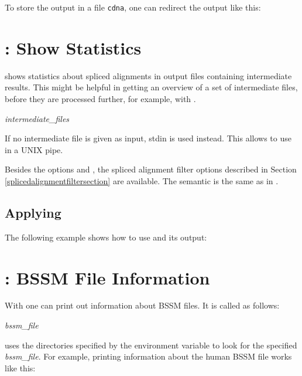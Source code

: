 \documentclass[11pt,a4paper,titlepage]{article}
\begin{document}

To store the output in a file \texttt{cdna}, one can redirect the output like this:


\section{\Callgthfilestat: Show Statistics}
\label{gthfilestatsection}
\Callgthfilestat shows statistics about spliced alignments in \Gth output files containing intermediate results.
This might be helpful in getting an overview of a set of intermediate files, before they are processed further, for example, with \Callgthsplit.

\medskip
{} \textit{intermediate\_files}
\medskip

If no intermediate file is given as input, stdin is used instead. This allows
to use \Callgthfilestat in a UNIX pipe.

Besides the options  and , the spliced alignment filter options described in Section \ref{splicedalignmentfiltersection}
are available. The semantic is the same as in \Callgth.

\subsection{Applying \Callgthfilestat}

The following example shows how to use \Callgthfilestat and its output:


\section{\Callgthbssmfileinfo: BSSM File Information}
\label{gthbssmfileinfosection}

With \Callgthbssmfileinfo one can print out information about BSSM files.  It is called as follows:

\medskip
\Callgthbssmfileinfo \textit{bssm\_file}
\medskip

\Callgthbssmfileinfo uses the directories specified by the environment variable \Environmentvariable{\bssmdir} to look for the specified \textit{bssm\_file}.
For example, printing information about the human BSSM file works like this:
\end{document}
